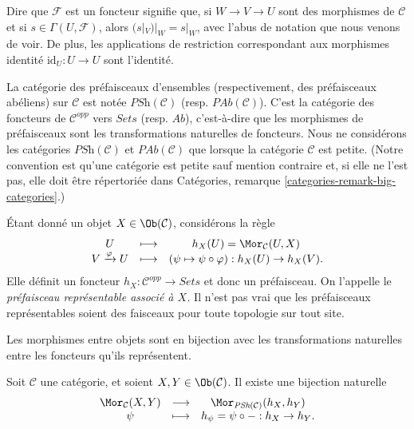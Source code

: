 \medskip\noindent
Dire que $\mathcal{F}$ est un foncteur signifie que, si
$W \to V \to U$ sont des morphismes de $\mathcal{C}$ et si
$s \in \Gamma(U, \mathcal{F})$, alors
$(s|_V)|_W = s |_W$, avec l'abus de
notation que nous venons de voir. De plus, les applications de restriction correspondant aux
morphismes identit\'e $\text{id}_U : U \to U$ sont l'identit\'e.

\medskip\noindent
La cat\'egorie des pr\'efaisceaux d'ensembles (respectivement, des pr\'efaisceaux ab\'eliens) sur
$\mathcal{C}$ est not\'ee $\textit{PSh} (\mathcal{C})$ (resp. $\textit{PAb}
(\mathcal{C})$). C'est la cat\'egorie des foncteurs de $\mathcal{C}^{opp}$ vers
$\textit{Sets}$ (resp. $\textit{Ab}$), c'est-\`a-dire que les morphismes de
pr\'efaisceaux sont les transformations naturelles de foncteurs. Nous ne consid\'erons les
cat\'egories $\textit{PSh}(\mathcal{C})$ et $\textit{PAb}(\mathcal{C})$
que lorsque la cat\'egorie $\mathcal{C}$ est petite. (Notre convention est qu'une cat\'egorie
est petite sauf mention contraire et, si elle ne l'est pas, elle doit \^etre
r\'epertori\'ee dans Cat\'egories, remarque \ref{categories-remark-big-categories}.)

\begin{example}
\label{example-representable-presheaf}
\'Etant donn\'e un objet $X \in \Ob(\mathcal{C})$, consid\'erons la r\`egle
$$
\begin{matrix}
U & \longmapsto & h_X(U) = \Mor_\mathcal{C}(U, X) \\
V \xrightarrow{\varphi} U & \longmapsto &
(\psi \mapsto \psi \circ \varphi) : h_X(U) \to h_X(V).
\end{matrix}
$$
Elle d\'efinit un foncteur $h_X : \mathcal{C}^{opp} \to \textit{Sets}$
et donc un pr\'efaisceau. On l'appelle le
{\it pr\'efaisceau repr\'esentable associ\'e \`a $X$.}
Il n'est pas vrai que les pr\'efaisceaux repr\'esentables soient des faisceaux pour toute topologie sur
tout site.
\end{example}

\begin{lemma}[Yoneda]
\label{lemma-yoneda}
\begin{slogan}
Les morphismes entre objets sont en bijection avec les transformations naturelles
entre les foncteurs qu'ils repr\'esentent.
\end{slogan}
Soit $\mathcal{C}$ une cat\'egorie, et soient $X, Y \in
\Ob(\mathcal{C})$. Il existe une bijection naturelle
$$
\begin{matrix}
\Mor_\mathcal{C}(X, Y) &
\longrightarrow &
\Mor_{\textit{PSh}(\mathcal{C})} (h_X, h_Y) \\
\psi &
\longmapsto &
h_\psi = \psi \circ - : h_X \to h_Y.
\end{matrix}
$$
\end{lemma}

